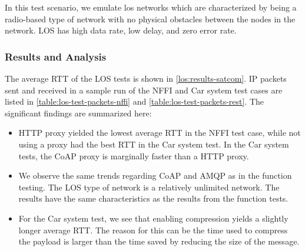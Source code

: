 In this test scenario, we emulate \gls{los} networks which are characterized by
being a radio-based type of network with no physical obstacles between the nodes
in the network. LOS has high data rate, low delay, and zero error rate.

\subsubsection{Results and Analysis}

The average RTT of the LOS tests is shown in \cref{los:results-satcom}. IP
packets sent and received in a sample run of the NFFI and Car system test cases
are listed in \cref{table:los-test-packets-nffi} and
\cref{table:los-test-packets-rest}. The significant findings are summarized
here:

\begin{itemize}

    \item HTTP proxy yielded the lowest average RTT in the NFFI test case, while
    not using a proxy had the best RTT in the Car system test. In the Car system
    tests, the CoAP proxy is marginally faster than a HTTP proxy.

    \item We observe the same trends regarding CoAP and AMQP as in the function
    testing. The LOS type of network is a relatively unlimited network. The results
    have the same characteristics as the results from the function tests.

    \item For the Car system test, we see that enabling compression yields a
    slightly longer average RTT. The reason for this can be the time used to
    compress the payload is larger than the time saved by reducing the size of
    the message.

\end{itemize}



